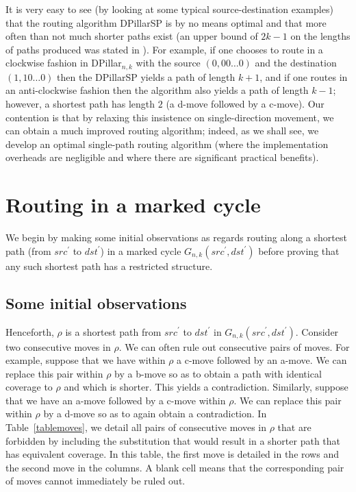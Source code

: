 \documentclass{article}
\begin{document}
It is very easy to see (by looking at some typical source-destination examples) that the routing algorithm DPillarSP is by no means optimal and that more often than not much shorter paths exist (an upper bound of $2k - 1$ on the lengths of paths produced was stated in \cite{LYY12}). For example, if one chooses to route in a clockwise fashion in DPillar$_{n,k}$ with the source $(0,00\ldots 0)$ and the destination $(1,10\ldots 0)$ then the DPillarSP yields a path of length $k + 1$, and if one routes in an anti-clockwise fashion then the algorithm also yields a path of length $k - 1$; however, a shortest path has length $2$ (a d-move followed by a c-move). Our contention is that by relaxing this insistence on single-direction movement, we can obtain a much improved routing algorithm; indeed, as we shall see, we develop an optimal single-path routing algorithm (where the implementation overheads are negligible and where there are significant practical benefits).

\section{Routing in a marked cycle}\label{sec:routingmarked}

We begin by making some initial observations as regards routing along a shortest path (from $src^\prime$ to $dst^\prime$) in a marked cycle $G_{n,k}(src^\prime,dst^\prime)$ before proving that any such shortest path has a restricted structure.

\subsection{Some initial observations}

Henceforth, $\rho$ is a shortest path from $src^\prime$ to $dst^\prime$ in $G_{n,k}(src^\prime,dst^\prime)$. Consider two consecutive moves in $\rho$. We can often rule out consecutive pairs of moves. For example, suppose that we have within $\rho$ a c-move followed by an a-move. We can replace this pair within $\rho$ by a b-move so as to obtain a path with identical coverage to $\rho$ and which is shorter. This yields a contradiction. Similarly, suppose that we have an a-move followed by a c-move within $\rho$. We can replace this pair within $\rho$ by a d-move so as to again obtain a contradiction. In Table~\ref{tablemoves}, we detail all pairs of consecutive moves in $\rho$ that are forbidden by including the substitution that would result in a shorter path that has equivalent coverage. In this table, the first move is detailed in the rows and the second move in the columns. A blank cell means that the corresponding pair of moves cannot immediately be ruled out.
\end{document}
